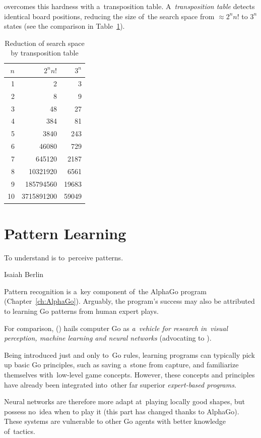 \Mueller{} overcomes this hardness with a~transposition table.
A~\emph{transposition table} detects identical board positions, reducing the size of~the search space from $\approx 2^n n!$ to $3^n$ states (see the comparison in Table~\ref{tab:reduction-transp-tab}).
\begin{table}[!htbp]
  \centering
  \begin{tabular}{ |rrr| }
    \hline
    \textbf{$n$} & \textbf{$2^nn!$} & \textbf{$3^n$} \\
    \hline
    1	&	2	&	3 \\ 
    2	&	8	&	9 \\ 
    3	&	48	&	27 \\ 
    4	&	384	&	81 \\ 
    5	&	3840	&	243 \\ 
    6	&	46080	&	729 \\ 
    7	&	645120	&	2187 \\ 
    8	&	10321920	&	6561 \\ 
    9	&	185794560	&	19683 \\ 
    10	&	3715891200	&	59049 \\ 
    \hline
  \end{tabular}
  \caption{Reduction of search space by transposition table}
  \label{tab:reduction-transp-tab}
\end{table}

\section{Pattern Learning}
\epigraph{To understand is to~perceive patterns.}
{Isaiah Berlin}
Pattern recognition is a~key component of~the AlphaGo program (Chapter~\ref{ch:AlphaGo}).
Arguably, the program's success may also be attributed to learning Go patterns from human expert plays.

For comparison, (\cite{Muller1995computer}) hails computer Go as \emph{a~vehicle for research in~visual perception, machine learning and neural networks} (advocating to \cite{Wilcox79, Enderton1991golem, Stoutamire1991machine, Schraudolph1994temporal}).

Being introduced just and only to~Go rules, learning programs can typically pick up basic Go principles, such as saving a~stone from capture, and familiarize themselves with~low-level game concepts.
However, these concepts and principles have already been integrated into~other far superior \emph{expert-based programs}.

Neural networks are therefore more adapt at~playing locally good shapes, but possess no~idea when to play it (this part has changed thanks to AlphaGo).
These systems are vulnerable to other Go agents with better knowledge of~tactics.

